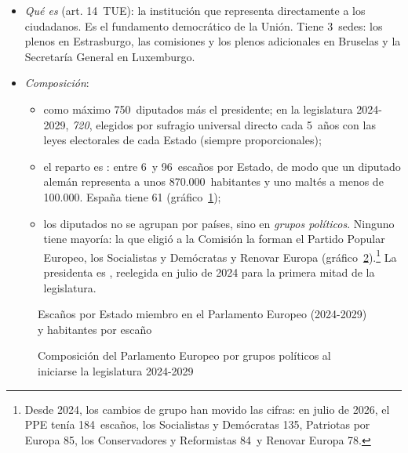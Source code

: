 \documentclass[11pt]{article}
\begin{document}
\begin{itemize}
\item \emph{Qué es} (art. 14~TUE): la institución que representa directamente a los ciudadanos. Es el fundamento democrático de la Unión. Tiene 3~sedes: los plenos en Estrasburgo, las comisiones y los plenos adicionales en Bruselas y la Secretaría General en Luxemburgo.
\item \emph{Composición}:
  \begin{itemize}
  \item como máximo 750~diputados más el presidente; en la legislatura 2024-2029, \emph{720}, elegidos por sufragio universal directo cada 5~años con las leyes electorales de cada Estado (siempre proporcionales);
  \item el reparto es : entre 6~y 96~escaños por Estado, de modo que un diputado alemán representa a unos 870.000~habitantes y uno maltés a menos de 100.000. España tiene 61 (gráfico~\ref{fig:escanos})\nocite{ConsejoEuropeo2023Composicion};
  \item los diputados no se agrupan por países, sino en \emph{grupos políticos}. Ninguno tiene mayoría: la que eligió a la Comisión la forman el Partido Popular Europeo, los Socialistas y Demócratas y Renovar Europa (gráfico~\ref{fig:grupos}).\footnote{Desde 2024, los cambios de grupo han movido las cifras: en julio de 2026, el PPE tenía 184~escaños, los Socialistas y Demócratas 135, Patriotas por Europa 85, los Conservadores y Reformistas 84~y Renovar Europa 78\nocite{SIEPS2026Centre}.} La presidenta es , reelegida en julio de 2024 para la primera mitad de la legislatura.
  \end{itemize}
\end{itemize}

\begin{figure}[H]
\centering
\caption{Escaños por Estado miembro en el Parlamento Europeo (2024-2029) y habitantes por escaño}\label{fig:escanos}
\end{figure}

\begin{figure}[H]
\centering
\caption{Composición del Parlamento Europeo por grupos políticos al iniciarse la legislatura 2024-2029}\label{fig:grupos}
\end{figure}
\end{document}
